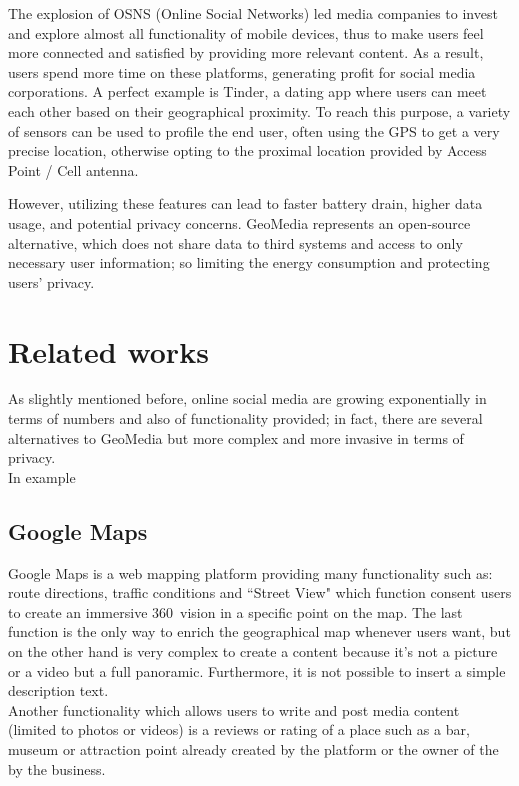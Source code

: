 \documentclass[conference]{IEEEtran}
\begin{document}
The explosion of OSNS (Online Social Networks) led media companies to invest and explore almost all functionality of mobile devices, thus to make users feel more connected and satisfied by providing more relevant content. As a result, users spend more time on these platforms, generating profit for social media corporations.
A perfect example is Tinder, a dating app where users can meet each other based on their geographical proximity.
To reach this purpose, a variety of sensors can be used to profile the end user, often using the GPS to get a very precise location, otherwise opting to the proximal location provided by Access Point / Cell antenna.

However, utilizing these features can lead to faster battery drain, higher data usage, and potential privacy concerns.
GeoMedia represents an open-source alternative, which does not share data to third systems and access to only necessary user information; so limiting the energy consumption and protecting users' privacy.
\\

\section{Related works}

As slightly mentioned before, online social media are growing exponentially in terms of numbers and also of functionality provided; in fact, there are several alternatives to GeoMedia but more complex and more invasive in terms of privacy. 
\\
In example
\subsection{Google Maps}
Google Maps\cite{GoogleMaps} is a web mapping platform providing many functionality such as: route directions, traffic conditions and ``Street View"\cite{StreetView} which function consent users to create an immersive 360\textdegree \  vision in a specific point on the map.
The last function is the only way to enrich the geographical map whenever users want, but on the other hand is very complex to create a content because it's not a picture or a video but a full panoramic.
Furthermore, it is not possible to insert a simple description text.
\\
Another functionality which allows users to write and post media content (limited to photos or videos) is a reviews or rating of a place such as a bar, museum or attraction point already created by the platform or the owner of the by the business.
\end{document}
